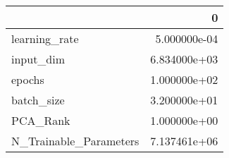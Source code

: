 \begin{tabular}{lr}
\toprule
{} &             0 \\
\midrule
learning\_rate          &  5.000000e-04 \\
input\_dim              &  6.834000e+03 \\
epochs                 &  1.000000e+02 \\
batch\_size             &  3.200000e+01 \\
PCA\_Rank               &  1.000000e+00 \\
N\_Trainable\_Parameters &  7.137461e+06 \\
\bottomrule
\end{tabular}
